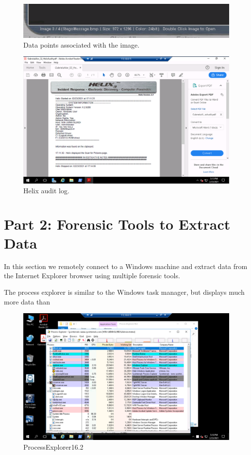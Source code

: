 \begin{figure}[H]
    \centering
    \includegraphics[width=\linewidth]{figures/Part 1 Step 13.png}
    \caption{Data points associated with the image.}
\end{figure}

\begin{figure}[H]
    \centering
    \includegraphics[width=\linewidth]{figures/Part 1 Step 14.png}
    \caption{Helix audit log.}
\end{figure}

\section*{Part 2: Forensic Tools to Extract Data}
In this section we remotely connect to a Windows machine and extract data from the Internet Explorer browser using multiple forensic tools.

The process explorer is similar to the Windows task manager, but displays much more data than 
\begin{figure}[H]
    \centering
    \includegraphics[width=\linewidth]{figures/Part 2 Step 1.png}
    \caption{ProcessExplorer16.2}
\end{figure}

